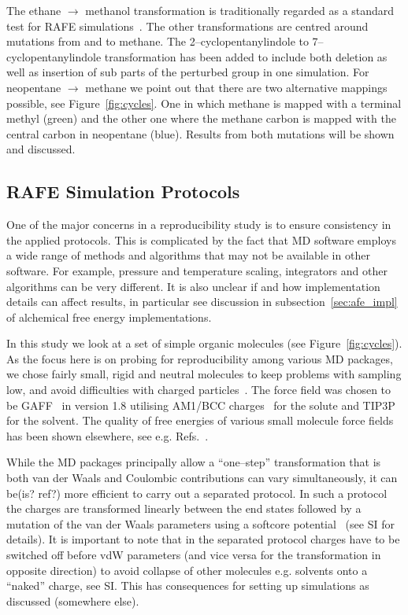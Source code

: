 \documentclass[journal=jctcce,manuscript=article]{achemso}
\begin{document}
The ethane $\rightarrow$ methanol transformation is traditionally
regarded as a standard test for RAFE
simulations~\cite{doi:10.1063/1.449208, doi:10.1021/jp981629f}.  The
other transformations are centred around mutations from and to
methane.  The 2--cyclopentanylindole to 7--cyclopentanylindole
transformation has been added to include both deletion as well as
insertion of sub parts of the perturbed group in one simulation.  For
neopentane $\rightarrow$ methane we point out that there are two
alternative mappings possible, see Figure~\ref{fig:cycles}.  One in
which methane is mapped with a terminal methyl (green) and the other
one where the methane carbon is mapped with the central carbon in
neopentane (blue).  Results from both mutations will be shown and
discussed.


\subsection{RAFE Simulation Protocols}
\label{sec:rafe_protocols}

One of the major concerns in a reproducibility study is to ensure
consistency in the applied protocols.  This is complicated by the fact
that MD software employs a wide range of methods and algorithms that
may not be available in other software.  For example, pressure and
temperature scaling, integrators and other algorithms can be very
different.  It is also unclear if and how implementation details can
affect results, in particular see discussion in
subsection~\ref{sec:afe_impl} of alchemical free energy
implementations.

In this study we look at a set of simple organic molecules (see
Figure~\ref{fig:cycles}).  As the focus here is on probing for
reproducibility among various MD packages, we chose fairly small,
rigid and neutral molecules to keep problems with sampling low, and
avoid difficulties with charged
particles~\cite{rocklin_calculating_2013, JCC:JCC1050}.  The force
field was chosen to be GAFF~\cite{wang_development_2004} in version
1.8 utilising AM1/BCC charges~\cite{jakalian_fast_2000,
  jakalian_fast_2002} for the solute and
TIP3P~\cite{jorgensen_comparison_1983-1} for the solvent.  The quality
of free energies of various small molecule force fields has been shown
elsewhere, see e.g. Refs.~.

While the MD packages principally allow a ``one--step'' transformation
that is both van der Waals and Coulombic contributions can vary
simultaneously, it can be(is? ref?) more efficient to carry out a
separated protocol.  In such a protocol the charges are transformed
linearly between the end states followed by a mutation of the van der
Waals parameters using a softcore
potential~\cite{beutler_avoiding_1994,
  zacharias_separationshifted_1994} (see SI for details).  It is
important to note that in the separated protocol charges have to be
switched off before vdW parameters (and vice versa for the
transformation in opposite direction) to avoid collapse of other
molecules e.g. solvents onto a ``naked'' charge, see SI.  This has
consequences for setting up simulations as discussed (somewhere else).
\end{document}
